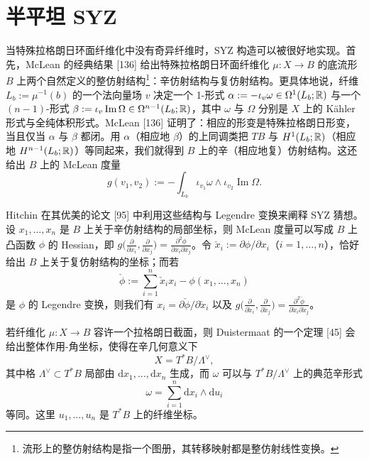 \section{半平坦 SYZ}
当特殊拉格朗日环面纤维化中没有奇异纤维时，SYZ 构造可以被很好地实现。首先，McLean 的经典结果 [136] 给出特殊拉格朗日环面纤维化 $\mu:X\to B$ 的底流形 $B$ 上两个自然定义的整仿射结构\footnote{流形上的整仿射结构是指一个图册，其转移映射都是整仿射线性变换。}：辛仿射结构与复仿射结构。更具体地说，纤维 $L_b:=\mu^{-1}(b)$ 的一个法向量场 $v$ 决定一个 1-形式 $\alpha:=-\iota_v\omega\in\Omega^1(L_b;\mathbb{R})$ 与一个 $(n-1)$-形式 $\beta:=\iota_v\operatorname{Im}\Omega\in\Omega^{n-1}(L_b;\mathbb{R})$，其中 $\omega$ 与 $\Omega$ 分别是 $X$ 上的 Kähler 形式与全纯体积形式。McLean [136] 证明了：相应的形变是特殊拉格朗日形变，当且仅当 $\alpha$ 与 $\beta$ 都闭。用 $\alpha$（相应地 $\beta$）的上同调类把 $TB$ 与 $H^1(L_b;\mathbb{R})$（相应地 $H^{n-1}(L_b;\mathbb{R})$）等同起来，我们就得到 $B$ 上的辛（相应地复）仿射结构。这还给出 $B$ 上的 McLean 度量
\[
g(v_1,v_2):=-\int_{L_b}\iota_{v_1}\omega\wedge\iota_{v_2}\operatorname{Im}\Omega .
\]

Hitchin 在其优美的论文 [95] 中利用这些结构与 Legendre 变换来阐释 SYZ 猜想。设 $x_1,\dots,x_n$ 是 $B$ 上关于辛仿射结构的局部坐标，则 McLean 度量可以写成 $B$ 上凸函数 $\phi$ 的 Hessian，即 $g\bigl(\frac{\partial}{\partial x_i},\frac{\partial}{\partial x_j}\bigr)=\frac{\partial^2\phi}{\partial x_i\partial x_j}$。令 $\check x_i:=\partial\phi/\partial x_i$（$i=1,\dots,n$），恰好给出 $B$ 上关于复仿射结构的坐标；而若
\[
\check\phi:=\sum_{i=1}^{n}\check x_ix_i-\phi(x_1,\dots,x_n)
\]
是 $\phi$ 的 Legendre 变换，则我们有 $x_i=\partial\check\phi/\partial\check x_i$ 以及 $g\bigl(\frac{\partial}{\partial\check x_i},\frac{\partial}{\partial\check x_j}\bigr)=\frac{\partial^2\check\phi}{\partial\check x_i\partial\check x_j}$。

若纤维化 $\mu:X\to B$ 容许一个拉格朗日截面，则 Duistermaat 的一个定理 [45] 会给出整体作用-角坐标，使得在辛几何意义下
\[
X=T^*B/\Lambda^\vee,
\]
其中格 $\Lambda^\vee\subset T^*B$ 局部由 $\mathrm{d}x_1,\dots,\mathrm{d}x_n$ 生成，而 $\omega$ 可以与 $T^*B/\Lambda^\vee$ 上的典范辛形式
\[
\omega=\sum_{i=1}^{n}\mathrm{d}x_i\wedge\mathrm{d}u_i
\]
等同。这里 $u_1,\dots,u_n$ 是 $T^*B$ 上的纤维坐标。


